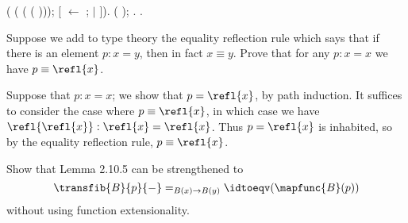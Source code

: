 \begin{coqdoccode}
\coqdocindent{2.00em}
 ( ( ( ( )));\coqdoceol
\coqdocindent{3.00em}
[ \ensuremath{\leftarrow} ;  \ensuremath{|}  ]).\coqdoceol
\coqdocindent{1.00em}
 ( ); .\coqdoceol
\coqdocnoindent
{}.\coqdoceol
\coqdocemptyline
\coqdocemptyline
\coqdocemptyline
\coqdocemptyline
\coqdocemptyline
\coqdocemptyline
\end{coqdoccode}
Suppose we add to type theory the equality reflection rule which says that if
there is an element $p : x = y$, then in fact $x \equiv y$.  Prove that for any
$p : x = x$ we have $p \equiv \refl{x}$.


 \soln
Suppose that $p : x = x$; we show that $p = \refl{x}$, by path induction.  It
suffices to consider the case where $p \equiv \refl{x}$, in which case we have
$\refl{\refl{x}} : \refl{x} = \refl{x}$.  Thus $p = \refl{x}$ is inhabited, so
by the equality reflection rule, $p \equiv \refl{x}$.


Show that Lemma 2.10.5 can be strengthened to
\[
  \transfib{B}{p}{-} =_{B(x)\to B(y)} \idtoeqv(\mapfunc{B}(p))
\]
without using function extensionality.


